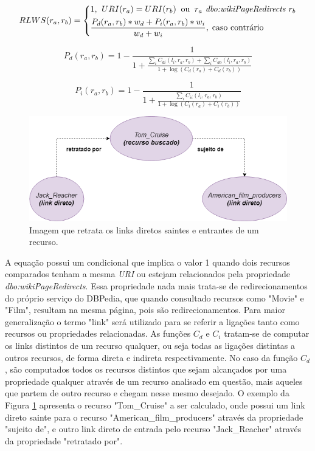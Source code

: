 \begin{equation}
	RLWS(r_a, r_b) = 
	\begin{dcases*}
		1 \text{,} \;\; URI(r_a) = URI(r_b) \;\; \text{ou} \;\; r_a \textit{ dbo:wikiPageRedirects } r_b\\
		\frac{P_d(r_a, r_b) * w_d + P_i(r_a, r_b) * w_i}{w_d + w_i}, \; \text{caso contrário}
	\end{dcases*}
\label{eq:rlws}
\end{equation}

\begin{equation}
	P_d(r_a, r_b) = 1 - \frac{1}{1 + \frac{\sum_i C_{di}(l_i, r_a, r_b) + \sum_i C_{do}(l_i, r_a, r_b)}{1 + \log (C_d(r_a) + C_d(r_b))}}
\label{eq:rlws_ex1}
\end{equation}

\begin{equation}
	P_i(r_a, r_b) = 1 - \frac{1}{1 + \frac{\sum_i C_{ii}(l_i, r_a, r_b)}{1 + \log (C_i(r_a) + C_i(r_b))}}
\label{eq:rlws_ex2}
\end{equation}

\begin{figure}
	\centering
	\includegraphics[scale=0.5]{imagens/cd_links.png}
	\caption{Imagem que retrata os links diretos saintes e entrantes de um recurso.}
	\label{fig:cd_links}
\end{figure}

A equação possui um condicional que implica o valor 1 quando dois recursos comparados tenham a mesma \textit{URI} ou estejam relacionados pela propriedade \textit{dbo:wikiPageRedirects}. Essa propriedade nada mais trata-se de redirecionamentos do próprio serviço do DBPedia, que quando consultado recursos como "Movie" e "Film", resultam na mesma página, pois são redirecionamentos. Para maior generalização o termo "link" será utilizado para se referir a ligações tanto como recursos ou propriedades relacionadas. As funções $C_d$ e $C_i$ tratam-se de computar os links distintos de um recurso qualquer, ou seja todas as ligações distintas a outros recursos, de forma direta e indireta respectivamente. No caso da função $C_d$, são computados todos os recursos distintos que sejam alcançados por uma propriedade qualquer através de um recurso analisado em questão, mais aqueles que partem de outro recurso e chegam nesse mesmo desejado. O exemplo da Figura \ref{fig:cd_links} apresenta o recurso "Tom\_Cruise" a ser calculado, onde possui um link direto sainte para o recurso "American\_film\_producers" através da propriedade "sujeito de", e outro link direto de entrada pelo recurso "Jack\_Reacher" através da propriedade "retratado por". 

